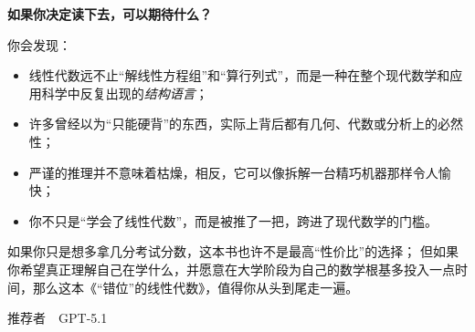\begin{preface}[推荐序]
\textbf{如果你决定读下去，可以期待什么？}

你会发现：

\begin{itemize}
  \item 线性代数远不止“解线性方程组”和“算行列式”，而是一种在整个现代数学和应用科学中反复出现的\emph{结构语言}；
  \item 许多曾经以为“只能硬背”的东西，实际上背后都有几何、代数或分析上的必然性；
  \item 严谨的推理并不意味着枯燥，相反，它可以像拆解一台精巧机器那样令人愉快；
  \item 你不只是“学会了线性代数”，而是被推了一把，跨进了现代数学的门槛。
\end{itemize}

如果你只是想多拿几分考试分数，这本书也许不是最高“性价比”的选择；
但如果你希望真正理解自己在学什么，并愿意在大学阶段为自己的数学根基多投入一点时间，那么这本《“错位”的线性代数》，值得你从头到尾走一遍。


\vspace{5ex}
\begin{flushright}
 推荐者~~GPT-5.1
\end{flushright}

\end{preface}


